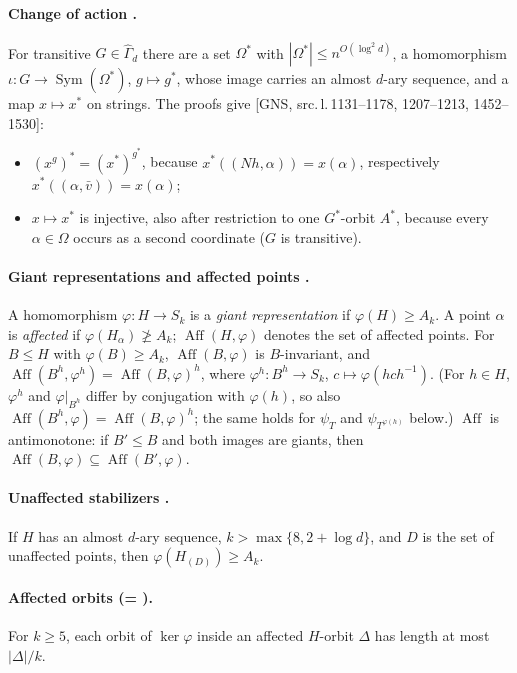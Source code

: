\documentclass[11pt]{article}
\theoremstyle{plain}
\theoremstyle{definition}
\theoremstyle{remark}
\theoremstyle{named}
\theoremstyle{namedrm}
\newcommand{\Sym}{\operatorname{Sym}}
\newcommand{\Aff}{\operatorname{Aff}}
\newcommand{\Gd}{\widehat{\Gamma}_d}
\newcommand{\src}[2]{[#1, src.\,l.\,#2]}
\begin{document}
\paragraph{Change of action \cite[Thms.~4.3, 4.6]{GNS}.} For transitive $G\in\Gd$ there are a set
$\Omega^*$ with $|\Omega^*|\le n^{O(\log^2 d)}$, a homomorphism $\iota\colon G\to\Sym(\Omega^*)$, $g\mapsto g^*$,
whose image carries an almost $d$-ary sequence, and a map $x\mapsto x^*$ on strings. The proofs give
\src{GNS}{1131--1178, 1207--1213, 1452--1530}:
\begin{itemize}
\item $(x^g)^*=(x^*)^{g^*}$, because $x^*((N h,\alpha))=x(\alpha)$, respectively $x^*((\alpha,\bar v))=x(\alpha)$;
\item $x\mapsto x^*$ is injective, also after restriction to one $G^*$-orbit $A^*$, because every
  $\alpha\in\Omega$ occurs as a second coordinate ($G$ is transitive).
\end{itemize}

\paragraph{Giant representations and affected points \cite[Def.~5.6]{GNS}.} A homomorphism
$\varphi\colon H\to S_k$ is a \emph{giant representation} if $\varphi(H)\ge A_k$. A point $\alpha$ is
\emph{affected} if $\varphi(H_\alpha)\not\ge A_k$; $\Aff(H,\varphi)$ denotes the set of affected points. For
$B\le H$ with $\varphi(B)\ge A_k$, $\Aff(B,\varphi)$ is $B$-invariant, and $\Aff(B^h,\varphi^h)=\Aff(B,\varphi)^h$, where $\varphi^h\colon B^h\to S_k$, $c\mapsto\varphi(hch^{-1})$. (For $h\in H$, $\varphi^h$ and $\varphi|_{B^h}$ differ by conjugation with $\varphi(h)$, so also $\Aff(B^h,\varphi)=\Aff(B,\varphi)^h$; the same holds for $\psi_T$ and $\psi_{T^{\varphi(h)}}$ below.)
$\Aff$ is antimonotone: if $B'\le B$ and both images are giants, then $\Aff(B,\varphi)\subseteq\Aff(B',\varphi)$.

\paragraph{Unaffected stabilizers \cite[Thm.~5.8]{GNS}.} If $H$ has an almost $d$-ary sequence,
$k>\max\{8,2+\log d\}$, and $D$ is the set of unaffected points, then $\varphi(H_{(D)})\ge A_k$.

\paragraph{Affected orbits \cite[Thm.~5.9]{GNS} (= \cite[Thm.~6(b)]{Bab16}).} For $k\ge5$, each orbit of
$\ker\varphi$ inside an affected $H$-orbit $\Delta$ has length at most $|\Delta|/k$.
\end{document}

